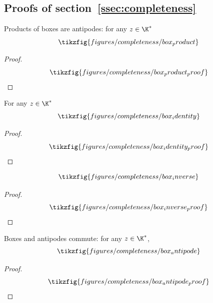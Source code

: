\subsection{Proofs of section~\ref{ssec:completeness}}
\label{app:completeness}
\begin{lemma}
  \label{lem:box_product}
  Products of boxes are antipodes: for any \(z \in \K^*\)
  \begin{equation*}
    \tikzfig{figures/completeness/box_product}
  \end{equation*}
\end{lemma}
\begin{proof}
  \begin{equation}
    \tikzfig{figures/completeness/box_product_proof}
  \end{equation}
\end{proof}
\begin{lemma}
  \label{lem:box_identity}
  For any \(z \in \K^*\)
  \begin{equation*}
    \tikzfig{figures/completeness/box_identity}
  \end{equation*}
\end{lemma}
\begin{proof}
  \begin{equation}
    \tikzfig{figures/completeness/box_identity_proof}
  \end{equation}
\end{proof}
\begin{lemma}
  \label{lem:box_inverse}
  \begin{equation*}
    \tikzfig{figures/completeness/box_inverse}
  \end{equation*}
\end{lemma}
\begin{proof}
  \begin{equation}
    \tikzfig{figures/completeness/box_inverse_proof}
  \end{equation}
\end{proof}
\begin{lemma}
  \label{lem:box_antipode}
  Boxes and antipodes commute: for any \(z \in \K^*\),
  \begin{equation*}
    \tikzfig{figures/completeness/box_antipode}
  \end{equation*}
\end{lemma}
\begin{proof}
  \begin{equation}
    \tikzfig{figures/completeness/box_antipode_proof}
  \end{equation}
\end{proof}
